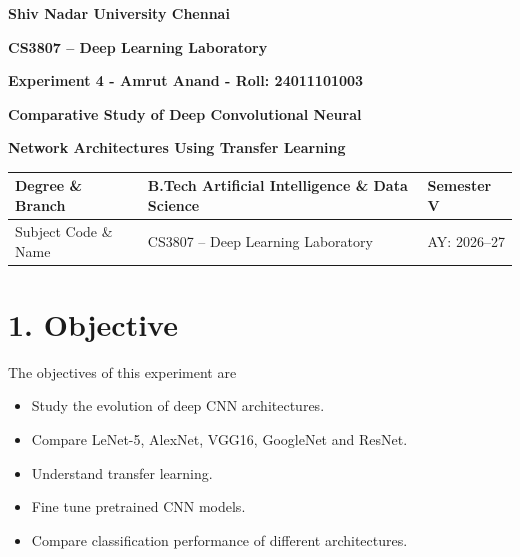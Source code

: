 \documentclass[11pt]{article}
\begin{document}

\begin{center}

{\Large\textbf{Shiv Nadar University Chennai}}

\vspace{3mm}

{\large\textbf{CS3807 -- Deep Learning Laboratory}}

\vspace{3mm}

{\Large\textbf{Experiment 4 - Amrut Anand - Roll: 24011101003}}

\vspace{2mm}

{\Large\textbf{Comparative Study of Deep Convolutional Neural}}

{\Large\textbf{Network Architectures Using Transfer Learning}}

\end{center}

\vspace{5mm}

\begin{tabular}{|p{4cm}|p{8cm}|p{2cm}|}
\hline
Degree \& Branch &
B.Tech Artificial Intelligence \& Data Science &
Semester V\\
\hline
Subject Code \& Name &
CS3807 -- Deep Learning Laboratory &
AY: 2026--27\\
\hline
\end{tabular}


\section*{1. Objective}

The objectives of this experiment are

\begin{itemize}

\item Study the evolution of deep CNN architectures.

\item Compare LeNet-5, AlexNet, VGG16, GoogleNet and ResNet.

\item Understand transfer learning.

\item Fine tune pretrained CNN models.

\item Compare classification performance of different architectures.

\end{itemize}
\end{document}
